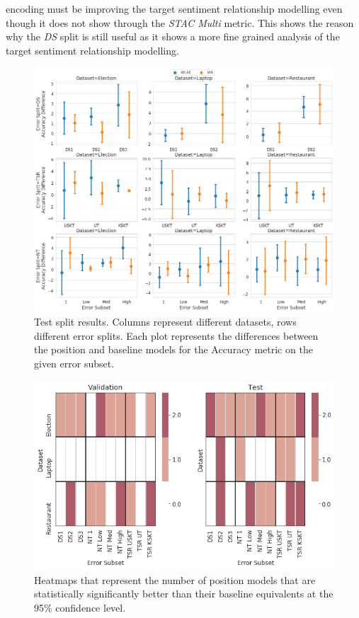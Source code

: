 encoding must be improving the target sentiment relationship modelling even though it does not show through the \textit{STAC Multi} metric. This shows the reason why the \textit{DS} split is still useful as it shows a more fine grained analysis of the target sentiment relationship modelling. 

\begin{figure}[h!]
    \centering
    \includegraphics[scale=0.32]{images/augmentation/methods_performance/Position_Encoding/position_split_difference_test_results.png}
    \caption{Test split results. Columns represent different datasets, rows different error splits. Each plot represents the differences between the position and baseline models for the Accuracy metric on the given error subset.}
    \label{fig:aug_position_split_difference_test_results}
\end{figure}

\begin{figure}[h!]
    \centering
    \includegraphics[scale=0.5]{images/augmentation/methods_performance/Position_Encoding/position_dataset_subset_heatmap.png}
    \caption{Heatmaps that represent the number of position models that are statistically significantly better than their baseline equivalents at the 95\% confidence level.}
    \label{fig:aug_position_dataset_subset_heatmap}
\end{figure}

